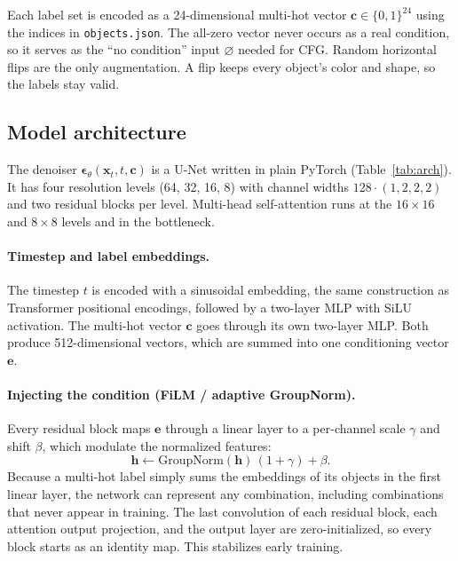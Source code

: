 \documentclass[11pt]{article}
\newcommand{\eps}{\boldsymbol{\epsilon}}
\newcommand{\x}{\mathbf{x}}
\newcommand{\cvec}{\mathbf{c}}
\begin{document}
Each label set is encoded as a 24-dimensional multi-hot vector $\cvec\in\{0,1\}^{24}$
using the indices in \texttt{objects.json}. The all-zero vector never occurs as a real
condition, so it serves as the ``no condition'' input $\varnothing$ needed for CFG.
Random horizontal flips are the only augmentation. A flip keeps every object's color and
shape, so the labels stay valid.

\subsection{Model architecture}
The denoiser $\eps_\theta(\x_t, t, \cvec)$ is a U-Net written in plain PyTorch
(Table~\ref{tab:arch}). It has four resolution levels (64, 32, 16, 8) with channel widths
$128\cdot(1,2,2,2)$ and two residual blocks per level. Multi-head self-attention runs at
the $16\times16$ and $8\times8$ levels and in the bottleneck.

\paragraph{Timestep and label embeddings.}
The timestep $t$ is encoded with a sinusoidal embedding, the same construction as
Transformer positional encodings, followed by a two-layer MLP with SiLU activation. The
multi-hot vector $\cvec$ goes through its own two-layer MLP. Both produce 512-dimensional
vectors, which are summed into one conditioning vector $\mathbf{e}$.

\paragraph{Injecting the condition (FiLM / adaptive GroupNorm).}
Every residual block maps $\mathbf{e}$ through a linear layer to a per-channel scale
$\gamma$ and shift $\beta$, which modulate the normalized features:
\begin{equation}
\mathbf{h} \leftarrow \mathrm{GroupNorm}(\mathbf{h})\,(1+\gamma) + \beta .
\end{equation}
Because a multi-hot label simply sums the embeddings of its objects in the first linear
layer, the network can represent any combination, including combinations that never
appear in training. The last convolution of each residual block, each attention output
projection, and the output layer are zero-initialized, so every block starts as an
identity map. This stabilizes early training.
\end{document}
